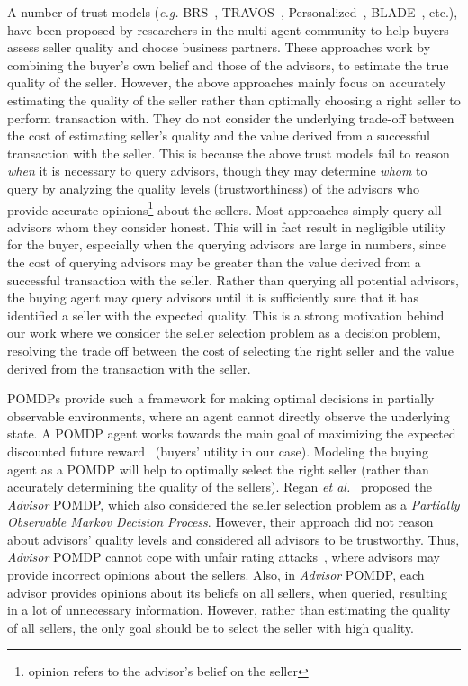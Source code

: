 \documentclass{aamas2013}
\begin{document}
A number of trust models (\textit{e.g.} BRS~\cite{whitby05}, TRAVOS~\cite{teach06}, Personalized~\cite{zhang09thesis}, BLADE~\cite{regan2006bayesian}, etc.), have been proposed by researchers in the multi-agent community to help buyers assess seller quality and choose business partners. These approaches work by combining the buyer's own belief and those of the advisors, to estimate the true quality of the seller. However, the above approaches mainly focus on accurately estimating the quality of the seller rather than optimally choosing a right seller to perform transaction with. They do not consider the underlying trade-off between the cost of estimating seller's quality and the value derived from a successful transaction with the seller. This is because the above trust models fail to reason \textit{when} it is necessary to query advisors, though they may determine \textit{whom} to query by analyzing the quality levels (trustworthiness) of the advisors who provide accurate opinions\footnote{opinion refers to the advisor's belief on the seller} about the sellers. Most approaches simply query all advisors whom they consider honest. This will in fact result in negligible utility for the buyer, especially when the querying advisors are large in numbers, since the cost of querying advisors may be greater than the value derived from a successful transaction with the seller. Rather than querying all potential advisors, the buying agent may query advisors until it is sufficiently sure that it has identified a seller with the expected quality. This is a strong motivation behind our work where we consider the seller selection problem as a decision problem, resolving the trade off between the cost of selecting the right seller and the value derived from the transaction with the seller.

POMDPs provide such a framework for making optimal decisions in partially observable environments, where an agent cannot directly observe the underlying state. A POMDP agent works towards the main goal of maximizing the expected discounted future reward~\cite{kaelbling1998planning} (buyers' utility in our case). Modeling the buying agent as a POMDP will help to optimally select the right seller (rather than accurately determining the quality of the sellers). Regan \textit{et al.}~\cite{regan2005advisor} proposed the \textit{Advisor} POMDP, which also considered the seller selection problem as a \textit{Partially Observable Markov Decision Process}. However, their approach did not reason about advisors' quality levels and considered all advisors to be trustworthy. Thus, \textit{Advisor} POMDP cannot cope with unfair rating attacks~\cite{irissappane2012towards}, where advisors may provide incorrect opinions about the sellers. Also, in \textit{Advisor} POMDP, each advisor provides opinions about its beliefs on all sellers, when queried, resulting in a lot of unnecessary information. However, rather than estimating the quality of all sellers, the only goal should be to select the seller with high quality.
\end{document}
